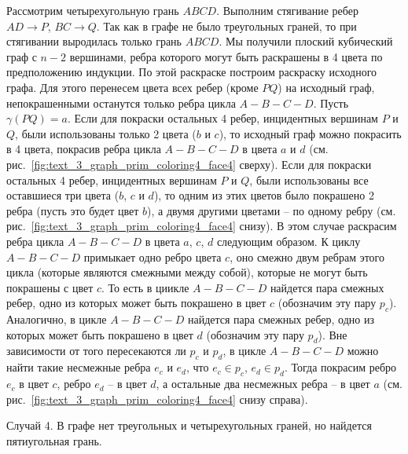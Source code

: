 Рассмотрим четырехугольную грань $ABCD$.
Выполним стягивание ребер $AD \rightarrow P$, $BC \rightarrow Q$.
Так как в графе не было треугольных граней, то при стягивании выродилась только грань $ABCD$.
Мы получили плоский кубический граф с $n - 2$ вершинами, ребра которого могут быть раскрашены в 4 цвета по предположению индукции.
По этой раскраске построим раскраску исходного графа.
Для этого перенесем цвета всех ребер (кроме $PQ$) на исходный граф, непокрашенными останутся только ребра цикла $A-B-C-D$.
Пусть $\gamma(PQ) = a$.
Если для покраски остальных 4 ребер, инцидентных вершинам $P$ и $Q$, были использованы только 2 цвета ($b$ и $c$), то исходный граф можно покрасить в 4 цвета, покрасив ребра цикла $A-B-C-D$ в цвета $a$ и $d$ (см. рис.~\ref{fig:text_3_graph_prim_coloring4_face4} сверху).
Если для покраски остальных 4 ребер, инцидентных вершинам $P$ и $Q$, были использованы все оставшиеся три цвета ($b$, $c$ и $d$), то одним из этих цветов было покрашено 2 ребра (пусть это будет цвет $b$), а двумя другими цветами -- по одному ребру (см. рис.~\ref{fig:text_3_graph_prim_coloring4_face4} снизу).
В этом случае раскрасим ребра цикла $A-B-C-D$ в цвета $a$, $c$, $d$ следующим образом.
К циклу $A-B-C-D$ примыкает одно ребро цвета $c$, оно смежно двум ребрам этого цикла (которые являются смежными между собой), которые не могут быть покрашены с цвет $c$.
То есть в циикле $A-B-C-D$ найдется пара смежных ребер, одно из которых может быть покрашено в цвет $c$ (обозначим эту пару $p_c$).
Аналогично, в цикле $A-B-C-D$ найдется пара смежных ребер, одно из которых может быть покрашено в цвет $d$ (обозначим эту пару $p_d$).
Вне зависимости от того пересекаются ли $p_c$ и $p_d$, в цикле $A-B-C-D$ можно найти такие несмежные ребра $e_c$ и $e_d$, что $e_c \in p_c$, $e_d \in p_d$.
Тогда покрасим ребро $e_c$ в цвет $c$, ребро $e_d$ -- в цвет $d$, а остальные два несмежных ребра -- в цвет $a$ (см. рис.~\ref{fig:text_3_graph_prim_coloring4_face4} снизу справа).

Случай 4. В графе нет треугольных и четырехугольных граней, но найдется пятиугольная грань.

